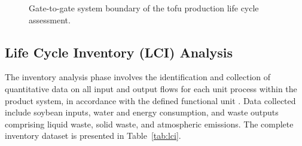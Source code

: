 \documentclass[12pt,a4paper]{article}
\begin{document}
\begin{figure}[H]
  \centering
  \fboxsep=8pt
  \caption{Gate-to-gate system boundary of the tofu production life cycle assessment.}
  \label{fig:sysboundary}
\end{figure}

\subsection{Life Cycle Inventory (LCI) Analysis}

The inventory analysis phase involves the identification and collection of quantitative data on all
input and output flows for each unit process within the product system, in accordance with the defined
functional unit \citep{Saavedra2022}. Data collected include soybean inputs, water and energy
consumption, and waste outputs comprising liquid waste, solid waste, and atmospheric emissions. The
complete inventory dataset is presented in Table~\ref{tab:lci}.
\end{document}
